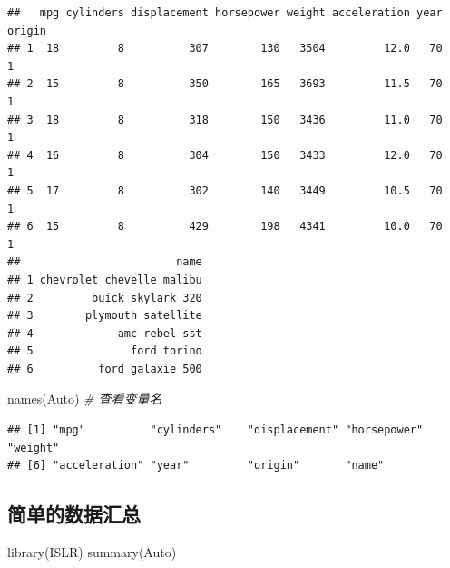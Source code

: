\documentclass[
]{book}
\newenvironment{Shaded}{\begin{snugshade}}{\end{snugshade}}
\newcommand{\CommentTok}[1]{\textcolor[rgb]{0.56,0.35,0.01}{\textit{#1}}}
\newcommand{\FunctionTok}[1]{\textcolor[rgb]{0.00,0.00,0.00}{#1}}
\newcommand{\NormalTok}[1]{#1}
\begin{document}
\begin{verbatim}
##   mpg cylinders displacement horsepower weight acceleration year origin
## 1  18         8          307        130   3504         12.0   70      1
## 2  15         8          350        165   3693         11.5   70      1
## 3  18         8          318        150   3436         11.0   70      1
## 4  16         8          304        150   3433         12.0   70      1
## 5  17         8          302        140   3449         10.5   70      1
## 6  15         8          429        198   4341         10.0   70      1
##                        name
## 1 chevrolet chevelle malibu
## 2         buick skylark 320
## 3        plymouth satellite
## 4             amc rebel sst
## 5               ford torino
## 6          ford galaxie 500
\end{verbatim}

\begin{Shaded}
\begin{Highlighting}[]
\FunctionTok{names}\NormalTok{(Auto) }\CommentTok{\# 查看变量名}
\end{Highlighting}
\end{Shaded}

\begin{verbatim}
## [1] "mpg"          "cylinders"    "displacement" "horsepower"   "weight"      
## [6] "acceleration" "year"         "origin"       "name"
\end{verbatim}

\hypertarget{ux7b80ux5355ux7684ux6570ux636eux6c47ux603b}{%
\subsection{简单的数据汇总}\label{ux7b80ux5355ux7684ux6570ux636eux6c47ux603b}}

\begin{Shaded}
\begin{Highlighting}[]
\FunctionTok{library}\NormalTok{(ISLR)}
\FunctionTok{summary}\NormalTok{(Auto)}
\end{Highlighting}
\end{Shaded}
\end{document}
